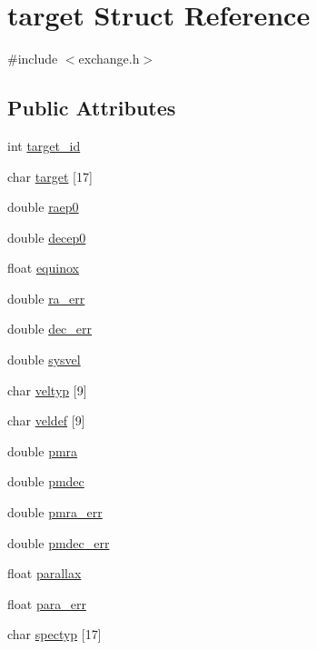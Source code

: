 \hypertarget{structtarget}{
\section{target Struct Reference}
\label{structtarget}
}


{\ttfamily \#include $<$exchange.h$>$}

\subsection*{Public Attributes}
\begin{DoxyCompactItemize}
\item 
int \hyperlink{structtarget_ad3c38e38d2f63ed0abd4d6b78825fd18}{target\_\-id}
\item 
char \hyperlink{structtarget_a91de5727458e9d952596de3f3deb0e81}{target} \mbox{[}17\mbox{]}
\item 
double \hyperlink{structtarget_a77d7ef62e5734c032fd755c0a6939a01}{raep0}
\item 
double \hyperlink{structtarget_a5423dd9bfc2da6209af70f09aab53651}{decep0}
\item 
float \hyperlink{structtarget_a130c24101c792f56b35b0a86d9d8d1a6}{equinox}
\item 
double \hyperlink{structtarget_a03fb3d5b5a9fb5a5b1fcb0359a323966}{ra\_\-err}
\item 
double \hyperlink{structtarget_a76aee9a0981bbcace91e379b4df6d100}{dec\_\-err}
\item 
double \hyperlink{structtarget_aca0e34f83749fe6dde307f51783beb5c}{sysvel}
\item 
char \hyperlink{structtarget_a18183dc4d60e923b73d3415122b8b5fe}{veltyp} \mbox{[}9\mbox{]}
\item 
char \hyperlink{structtarget_ad60c3645c54b790063f193bee1408477}{veldef} \mbox{[}9\mbox{]}
\item 
double \hyperlink{structtarget_a2325354eca9fec50369db0467e230aea}{pmra}
\item 
double \hyperlink{structtarget_a629ab0bc1383fb1ba302abfaeeb58b46}{pmdec}
\item 
double \hyperlink{structtarget_a74858f3d4668eca8da57e70efca3e471}{pmra\_\-err}
\item 
double \hyperlink{structtarget_a962f6069f1ae96a7e8bf775f50f3121c}{pmdec\_\-err}
\item 
float \hyperlink{structtarget_afb00204e4dc631a441e3eaf5356ad152}{parallax}
\item 
float \hyperlink{structtarget_a23a3834cdc18d79fe8f4ec521117c1ba}{para\_\-err}
\item 
char \hyperlink{structtarget_a1d51d318f08839ace902eea3e741ffdf}{spectyp} \mbox{[}17\mbox{]}
\end{DoxyCompactItemize}



